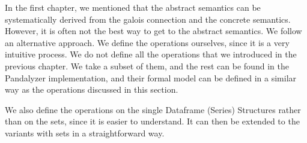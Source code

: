 In the first chapter, we mentioned that the abstract semantics can be systematically derived from the galois connection
and the concrete semantics.
However, it is often not the best way to get to the abstract semantics.
We follow an alternative approach.
We define the operations ourselves, since it is a very intuitive process.
We do not define all the operations that we introduced in the previous chapter.
We take a subset of them, and the rest can be found in the Pandalyzer implementation, and their formal model can be
defined in a similar way as the operations discussed in this section.

We also define the operations on the single Dataframe (Series) Structures rather than on the sets, since it is
easier to understand.
It can then be extended to the variants with sets in a straightforward way.

